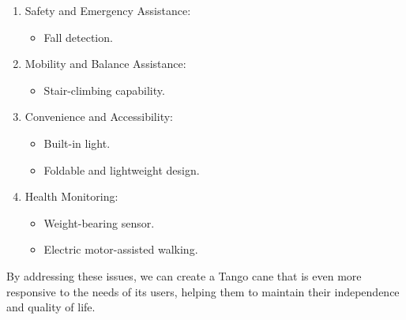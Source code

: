 \documentclass[12pt, twoside]{report}
\begin{document}
\begin{enumerate}
    \item Safety and Emergency Assistance:
    \begin{itemize}
        \item Fall detection. %
    \end{itemize}

    \item Mobility and Balance Assistance:
    \begin{itemize}
        \item Stair-climbing capability. %
    \end{itemize}

    \item Convenience and Accessibility:
    \begin{itemize}
        \item Built-in light.
        \item Foldable and lightweight design. %
    \end{itemize}

    \item Health Monitoring:
    \begin{itemize}
        \item Weight-bearing sensor. %
        \item Electric motor-assisted walking.
    \end{itemize}
\end{enumerate}

By addressing these issues, we can create a Tango cane that is even more responsive to the needs of its users, helping them to maintain their independence and quality of life.
\end{document}
